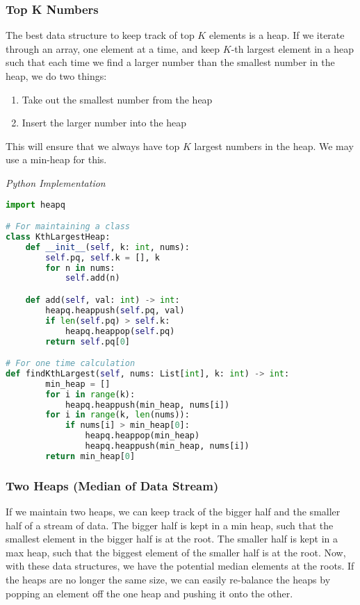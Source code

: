 \documentclass{article}
\begin{document}
    \subsubsection{Top K Numbers}
    The best data structure to keep track of top $K$ elements is a heap. If we iterate through an array, one element at a time, and keep $K$-th largest element in a heap such that each time we find a larger number than the smallest number in the heap, we do two things:
    \begin{enumerate}
        \item Take out the smallest number from the heap
        \item Insert the larger number into the heap
    \end{enumerate}
    This will ensure that we always have top $K$ largest numbers in the heap. We may use a min-heap for this.

\vspace{8pt} \emph{Python Implementation}
\begin{lstlisting}[language=Python]
import heapq

# For maintaining a class
class KthLargestHeap:
    def __init__(self, k: int, nums):
        self.pq, self.k = [], k
        for n in nums:
            self.add(n)

    def add(self, val: int) -> int:
        heapq.heappush(self.pq, val)
        if len(self.pq) > self.k:
            heapq.heappop(self.pq)
        return self.pq[0]

# For one time calculation
def findKthLargest(self, nums: List[int], k: int) -> int:
        min_heap = []
        for i in range(k):
            heapq.heappush(min_heap, nums[i])
        for i in range(k, len(nums)):
            if nums[i] > min_heap[0]:
                heapq.heappop(min_heap)
                heapq.heappush(min_heap, nums[i])
        return min_heap[0]
\end{lstlisting}

    
    \subsubsection{Two Heaps (Median of Data Stream)}
    If we maintain two heaps, we can keep track of the bigger half and the smaller half of a stream of data. The bigger half is kept in a min heap, such that the smallest element in the bigger half is at the root. The smaller half is kept in a max heap, such that the biggest element of the smaller half is at the root. Now, with these data structures, we have the potential median elements at the roots. If the heaps are no longer the same size, we can easily re-balance the heaps by popping an element off the one heap and pushing it onto the other.
\end{document}
